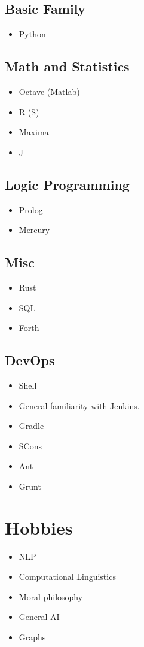 \documentclass[11pt]{article}
\begin{document}
\subsection{Basic Family}
\label{sec-4-4}
\begin{itemize}
\item Python
\end{itemize}
\subsection{Math and Statistics}
\label{sec-4-5}
\begin{itemize}
\item Octave (Matlab)
\item R (S)
\item Maxima
\item J
\end{itemize}
\subsection{Logic Programming}
\label{sec-4-6}
\begin{itemize}
\item Prolog
\item Mercury
\end{itemize}
\subsection{Misc}
\label{sec-4-7}
\begin{itemize}
\item Rust
\item SQL
\item Forth
\end{itemize}
\subsection{DevOps}
\label{sec-4-8}
\begin{itemize}
\item Shell
\item General familiarity with Jenkins.
\item Gradle
\item SCons
\item Ant
\item Grunt
\end{itemize}
\section{Hobbies}
\label{sec-5}
\begin{itemize}
\item NLP
\item Computational Linguistics
\item Moral philosophy
\item General AI
\item Graphs
\end{itemize}
\end{document}
